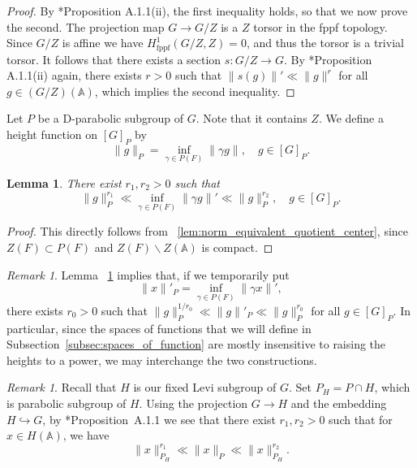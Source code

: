 \documentclass[letterpaper,11pt]{amsart}
\newcommand{\bA}{\mathbb{A}}
\newcommand{\<}{\negthickspace}
\providecommand{\aabs}[1]{\lVert#1\rVert}
\theoremstyle{definition}
\theoremstyle{plain}
\newtheorem{lemma}[definition]{Lemma}
\theoremstyle{remark}
\newtheorem{remark}[definition]{Remark}
\numberwithin{equation}{section}
\begin{document}
\begin{proof}
By \cite{BP}*{Proposition A.1.1(ii)}, the first inequality holds, so that we now
prove the second. The projection map $G \to G/Z$ is a $Z$ torsor in the fppf
topology. Since $G/Z$ is affine we have $H^1_\mathrm{fppf}(G/Z,Z) = 0$, and thus the
torsor is a trivial torsor. It follows that there exists a section $s:G/Z \to G$. By
\cite{BP}*{Proposition A.1.1(ii)} again, there exists $r>0$ such that $\|s(g)\|' \ll \|g\|^{r}$ for all $g \in (G/Z)(\bA)$, which implies the second inequality.
\end{proof}

Let $P$ be a D-parabolic subgroup of $G$. Note that it contains $Z$. We define a height function on $[G]_P$ by
    \begin{equation} \label{eq:aabs_P}
         \aabs{g}_P = \inf_{\gamma \in P(F)} \aabs{\gamma g},
        \quad g \in [G]_P.
    \end{equation}

\begin{lemma} \label{lem:norm_on_[G]_P equivalent}
There exist $r_1,r_2>0$ such that
    \[
    \| g \|_{P}^{r_1}
       \ll \inf_{\gamma \in P(F)} \| \gamma g\|'
    \ll \| g \|_P^{r_2}, \quad g \in [G]_P.
    \]
\end{lemma}

\begin{proof}
This directly follows from ~\ref{lem:norm_equivalent_quotient_center}, since
$Z(F) \subset P(F)$ and $Z(F) \backslash Z(\bA)$ is compact.
\end{proof}



\begin{remark} \label{rem:[G]_P_height_equivalent}
    Lemma ~\ref{lem:norm_on_[G]_P equivalent} implies that, if we temporarily put
\[
    \| x \|'_P = \inf_{\gamma \in P(F)} \| \gamma x \|',
\]
there exists $r_0>0$ such that $\| g \|_P^{1/r_0} \ll \| g \|'_P \ll \| g \|_P^{r_0}$ for all $g \in [G]_P$. In particular, since the spaces of functions that we will define in Subsection~\ref{subsec:spaces_of_function} are mostly insensitive to raising the heights to a power, we may interchange the two constructions.
\end{remark}

\begin{remark} \label{rem:height_on_[G]_P_and_[H]_P_H}
\label{rk:heights_H}
    Recall that $H$ is our fixed Levi subgroup of $G$. Set $P_H=P \cap H$, which is parabolic subgroup of $H$. Using the projection $G \to H$ and the embedding $H \hookrightarrow G$, by \cite{BP}*{Proposition~A.1.1} we see that there exist $r_1,r_2 > 0$ such that for $x \in H(\bA)$, we have
    \[
        \| x \|_{P_H}^{r_1} \ll  \| x \|_{P} \ll \| x \|_{P_H}^{r_2}.
    \]
\end{remark}
\end{document}
